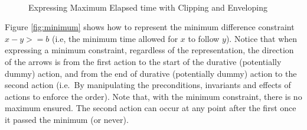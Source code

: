 \documentclass
[a4paper
,english
,parskip=half
,bibliography=totoc
]{scrreprt}
\begin{document}
        \begin{figure}[h]
            \hfill
            \\
            \vfill
            \centering
                \caption{Expressing Maximum Elapsed time with Clipping and Enveloping}
                \label{fig:maximum_compact}
        \label{fig:maximum}
        \end{figure}

        
        Figure \ref{fig:minimum} shows how to represent the minimum difference constraint \(x-y>=b\) (i.e, the minimum time allowed for \(x\) to follow \(y\)). Notice that when expressing a minimum constraint, regardless of the representation, the direction of the arrows is from the first action to the start of the durative (potentially dummy) action, and from the end of durative (potentially dummy) action to the second action (i.e.\ By manipulating the preconditions, invariants and effects of actions to enforce the order). Note that, with the minimum constraint, there is no maximum ensured. The second action can occur at any point after the first once it passed the minimum (or never).
\end{document}
